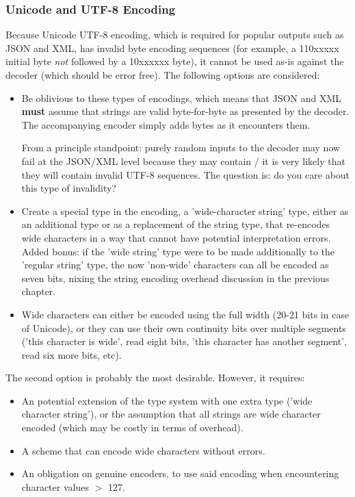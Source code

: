 \subsubsection{Unicode and UTF-8 Encoding}

Because Unicode \cite{bib:unicode} UTF-8 \cite{bib:utf8} encoding,
which is required for popular outputs such as
JSON and XML, has invalid byte encoding sequences
(for example, a 110xxxxx initial byte \textit{not} followed by a
10xxxxxx byte), it cannot be used as-is against the decoder (which
should be error free). The following options are considered:

\begin{itemize}
\item Be oblivious to these types of encodings, which means that JSON and XML
      \textbf{must} assume that strings are valid byte-for-byte
      as presented by the decoder. The accompanying encoder simply
      adds bytes as it encounters them.

      From a principle standpoint: purely random inputs to the
      decoder may now fail at the JSON/XML level because they may
      contain / it is very likely that they will contain invalid
      UTF-8 sequences. The question is: do you care about this type
      of invalidity?
\item Create a special type in the encoding, a 'wide-character string' type,
      either as an additional type or as a replacement of the string type,
      that re-encodes wide characters in a way that cannot have
      potential interpretation errors. Added bonus: if the 'wide string' type
      were to be made additionally to the 'regular string' type, the now
      'non-wide' characters can all be encoded as seven bits, nixing the
      string encoding overhead discussion in the previous chapter.
\item Wide characters can either be encoded using the full width (20-21 bits
      in case of Unicode), or they can use their own continuity bits over
      multiple segments ('this character is wide', read eight bits,
      'this character has another segment', read six more bits, etc).
\end{itemize}

The second option is probably the most desirable. However, it requires:

\begin{itemize}
\item An potential extension of the type system with one extra type
      ('wide character string'), or the assumption that all strings are
      wide character encoded (which may be costly in terms of overhead).
\item A scheme that can encode wide characters without errors.
\item An obligation on genuine encoders, to use said encoding when
      encountering character values $>$ 127.
\end{itemize}

